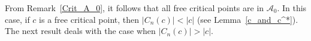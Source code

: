 \documentclass[12pt]{article}
\begin{document}





From Remark~\ref{Crit_A_0}, it follows that all free critical points are in $\mathcal{A}_0$. In this case, if $c$ is a free critical point, then $|C_n(c)|<|c|$ (see Lemma~\ref{c_and_c^*}). The next result deals with the case when $|C_n(c)|>|c|$.
\end{document}
